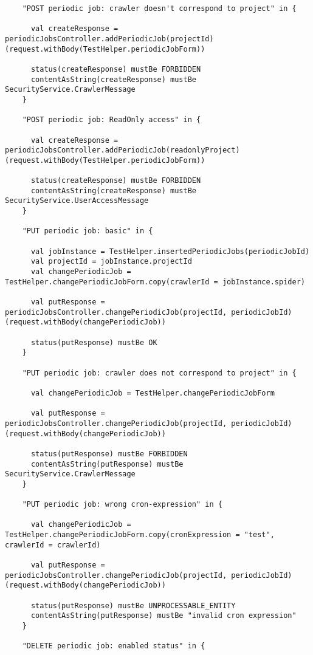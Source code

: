 \begin{lstlisting}
    "POST periodic job: crawler doesn't correspond to project" in {

      val createResponse = periodicJobsController.addPeriodicJob(projectId)(request.withBody(TestHelper.periodicJobForm))

      status(createResponse) mustBe FORBIDDEN
      contentAsString(createResponse) mustBe SecurityService.CrawlerMessage
    }

    "POST periodic job: ReadOnly access" in {

      val createResponse = periodicJobsController.addPeriodicJob(readonlyProject)(request.withBody(TestHelper.periodicJobForm))

      status(createResponse) mustBe FORBIDDEN
      contentAsString(createResponse) mustBe SecurityService.UserAccessMessage
    }

    "PUT periodic job: basic" in {

      val jobInstance = TestHelper.insertedPeriodicJobs(periodicJobId)
      val projectId = jobInstance.projectId
      val changePeriodicJob = TestHelper.changePeriodicJobForm.copy(crawlerId = jobInstance.spider)

      val putResponse = periodicJobsController.changePeriodicJob(projectId, periodicJobId)(request.withBody(changePeriodicJob))

      status(putResponse) mustBe OK
    }

    "PUT periodic job: crawler does not correspond to project" in {

      val changePeriodicJob = TestHelper.changePeriodicJobForm

      val putResponse = periodicJobsController.changePeriodicJob(projectId, periodicJobId)(request.withBody(changePeriodicJob))

      status(putResponse) mustBe FORBIDDEN
      contentAsString(putResponse) mustBe SecurityService.CrawlerMessage
    }

    "PUT periodic job: wrong cron-expression" in {

      val changePeriodicJob = TestHelper.changePeriodicJobForm.copy(cronExpression = "test", crawlerId = crawlerId)

      val putResponse = periodicJobsController.changePeriodicJob(projectId, periodicJobId)(request.withBody(changePeriodicJob))

      status(putResponse) mustBe UNPROCESSABLE_ENTITY
      contentAsString(putResponse) mustBe "invalid cron expression"
    }

    "DELETE periodic job: enabled status" in {


\end{lstlisting}
